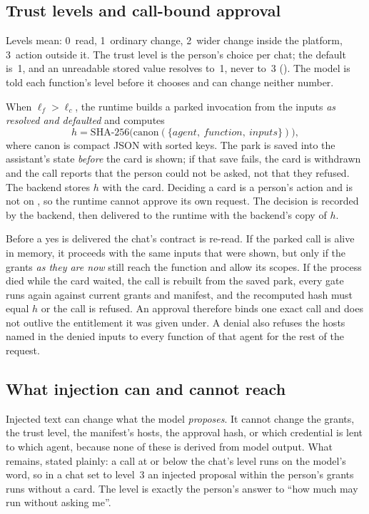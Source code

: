 \subsection{Trust levels and call-bound approval}

Levels mean: 0~read, 1~ordinary change, 2~wider change inside the
platform, 3~action outside it. The trust level is the person's choice
per chat; the default is~1, and an unreadable stored value resolves
to~1, never to~3 ().
The model is told each function's level before it chooses and can
change neither number.

When $\ell_f > \ell_c$, the runtime builds a parked invocation from the
inputs \emph{as resolved and defaulted} and computes
\[
h = \mathrm{SHA\text{-}256}\bigl(\mathrm{canon}(\{\mathit{agent},\ \mathit{function},\ \mathit{inputs}\})\bigr),
\]
where $\mathrm{canon}$ is compact JSON with sorted keys. The park is
saved into the assistant's state \emph{before} the card is shown; if
that save fails, the card is withdrawn and the call reports that the
person could not be asked, not that they refused. The backend stores
$h$ with the card. Deciding a card is a person's action and is not on
, so the runtime cannot approve its own
request. The decision is recorded by the backend, then delivered to the
runtime with the backend's copy of $h$.

Before a yes is delivered the chat's contract is re-read. If the
parked call is alive in memory, it proceeds with the same inputs that
were shown, but only if the grants \emph{as they are now} still reach
the function and allow its scopes. If the process died while the card
waited, the call is rebuilt from the saved park, every gate runs again
against current grants and manifest, and the recomputed hash must equal
$h$ or the call is refused. An approval therefore binds one exact call
and does not outlive the entitlement it was given under. A denial also
refuses the hosts named in the denied inputs to every function of that
agent for the rest of the request.

\subsection{What injection can and cannot reach}

Injected text can change what the model \emph{proposes}. It cannot
change the grants, the trust level, the manifest's hosts, the approval
hash, or which credential is lent to which agent, because none of
these is derived from model output. What remains, stated plainly: a
call at or below the chat's level runs on the model's word, so in a
chat set to level~3 an injected proposal within the person's grants
runs without a card. The level is exactly the person's answer to ``how
much may run without asking me''.

